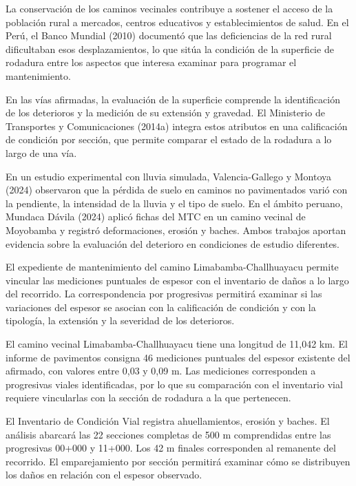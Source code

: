 \documentclass[12pt,a4paper]{article}
\begin{document}
La conservación de los caminos vecinales contribuye a sostener el acceso de la población rural a mercados, centros educativos y establecimientos de salud. En el Perú, el Banco Mundial (2010) documentó que las deficiencias de la red rural dificultaban esos desplazamientos, lo que sitúa la condición de la superficie de rodadura entre los aspectos que interesa examinar para programar el mantenimiento.

En las vías afirmadas, la evaluación de la superficie comprende la identificación de los deterioros y la medición de su extensión y gravedad. El Ministerio de Transportes y Comunicaciones (2014a) integra estos atributos en una calificación de condición por sección, que permite comparar el estado de la rodadura a lo largo de una vía.

En un estudio experimental con lluvia simulada, Valencia-Gallego y Montoya (2024) observaron que la pérdida de suelo en caminos no pavimentados varió con la pendiente, la intensidad de la lluvia y el tipo de suelo. En el ámbito peruano, Mundaca Dávila (2024) aplicó fichas del MTC en un camino vecinal de Moyobamba y registró deformaciones, erosión y baches. Ambos trabajos aportan evidencia sobre la evaluación del deterioro en condiciones de estudio diferentes.

El expediente de mantenimiento del camino Limabamba-Challhuayacu permite vincular las mediciones puntuales de espesor con el inventario de daños a lo largo del recorrido. La correspondencia por progresivas permitirá examinar si las variaciones del espesor se asocian con la calificación de condición y con la tipología, la extensión y la severidad de los deterioros.

El camino vecinal Limabamba-Challhuayacu tiene una longitud de 11,042 km. El informe de pavimentos consigna 46 mediciones puntuales del espesor existente del afirmado, con valores entre 0,03 y 0,09 m. Las mediciones corresponden a progresivas viales identificadas, por lo que su comparación con el inventario vial requiere vincularlas con la sección de rodadura a la que pertenecen.

El Inventario de Condición Vial registra ahuellamientos, erosión y baches. El análisis abarcará las 22 secciones completas de 500 m comprendidas entre las progresivas 00+000 y 11+000. Los 42 m finales corresponden al remanente del recorrido. El emparejamiento por sección permitirá examinar cómo se distribuyen los daños en relación con el espesor observado.
\end{document}
